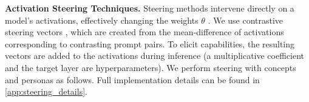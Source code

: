 

\textbf{Activation Steering Techniques.} Steering methods intervene directly on a model's activations, effectively changing the weights $\theta$ \citep{turner2023activation}. 
We use contrastive steering vectors \citep{rimsky2023steering}, which are created from the mean-difference of activations corresponding to contrasting prompt pairs. To elicit capabilities, the resulting vectors are added to the activations during inference (a multiplicative coefficient and the target layer are hyperparameters). We perform steering with concepts and personas as follows. Full implementation details can be found in \cref{app:steering_details}.


